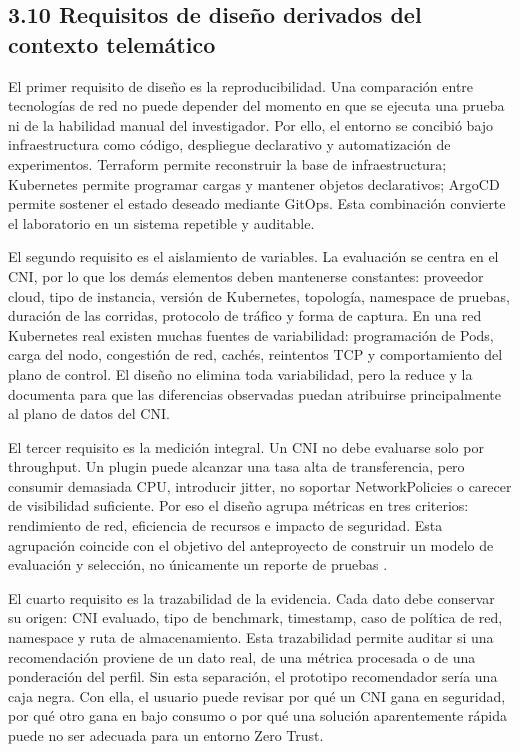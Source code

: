 \documentclass[journal]{IEEEtran}
\begin{document}
\subsection{3.10 Requisitos de diseño derivados del contexto telemático}

El primer requisito de diseño es la reproducibilidad. Una comparación entre tecnologías de red no puede depender del momento en que se ejecuta una prueba ni de la habilidad manual del investigador. Por ello, el entorno se concibió bajo infraestructura como código, despliegue declarativo y automatización de experimentos. Terraform permite reconstruir la base de infraestructura; Kubernetes permite programar cargas y mantener objetos declarativos; ArgoCD permite sostener el estado deseado mediante GitOps. Esta combinación convierte el laboratorio en un sistema repetible y auditable.

El segundo requisito es el aislamiento de variables. La evaluación se centra en el CNI, por lo que los demás elementos deben mantenerse constantes: proveedor cloud, tipo de instancia, versión de Kubernetes, topología, namespace de pruebas, duración de las corridas, protocolo de tráfico y forma de captura. En una red Kubernetes real existen muchas fuentes de variabilidad: programación de Pods, carga del nodo, congestión de red, cachés, reintentos TCP y comportamiento del plano de control. El diseño no elimina toda variabilidad, pero la reduce y la documenta para que las diferencias observadas puedan atribuirse principalmente al plano de datos del CNI.

El tercer requisito es la medición integral. Un CNI no debe evaluarse solo por throughput. Un plugin puede alcanzar una tasa alta de transferencia, pero consumir demasiada CPU, introducir jitter, no soportar NetworkPolicies o carecer de visibilidad suficiente. Por eso el diseño agrupa métricas en tres criterios: rendimiento de red, eficiencia de recursos e impacto de seguridad. Esta agrupación coincide con el objetivo del anteproyecto de construir un modelo de evaluación y selección, no únicamente un reporte de pruebas \cite{ref29}.

El cuarto requisito es la trazabilidad de la evidencia. Cada dato debe conservar su origen: CNI evaluado, tipo de benchmark, timestamp, caso de política de red, namespace y ruta de almacenamiento. Esta trazabilidad permite auditar si una recomendación proviene de un dato real, de una métrica procesada o de una ponderación del perfil. Sin esta separación, el prototipo recomendador sería una caja negra. Con ella, el usuario puede revisar por qué un CNI gana en seguridad, por qué otro gana en bajo consumo o por qué una solución aparentemente rápida puede no ser adecuada para un entorno Zero Trust.
\end{document}

